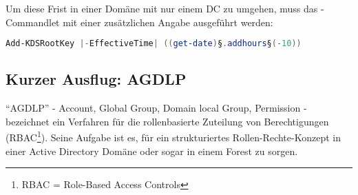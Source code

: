           Um diese Frist in einer Domäne mit nur einem DC zu umgehen, muss das
          -Commandlet mit einer zusätzlichen
          Angabe ausgeführt werden:
            \begin{lstlisting}[language=powershell, caption={Erstellen eines KDS
              Root Keys}, label=create_kds_root_key_2]
  Add-KDSRootKey |-EffectiveTime| ((get-date)§.addhours§(-10))
          \end{lstlisting}
          \begin{literaturinternet}
            \item \cite{jj128430}
          \end{literaturinternet}
      \subsection{Kurzer Ausflug: AGDLP}
        \enquote{AGDLP} - Account, Global Group, Domain local Group, Permission - 
        bezeichnet ein Verfahren für die rollenbasierte Zuteilung von
        Berechtigungen (RBAC\footnote{RBAC = Role-Based Access Controls}).
        Seine Aufgabe ist es, für ein strukturiertes Rollen-Rechte-Konzept in
        einer Active Directory Domäne oder sogar in einem Forest zu sorgen.
  
